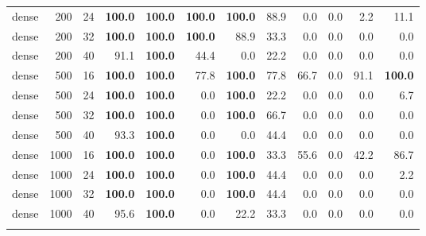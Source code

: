 \begin{table}
\begin{tabular}{lrrrrrrrrrrr}
dense & 200 & 24 & \textbf{100.0} & \textbf{100.0} & \textbf{100.0} & \textbf{100.0} & 88.9 & 0.0 & 0.0 & 2.2 & 11.1 \\
dense & 200 & 32 & \textbf{100.0} & \textbf{100.0} & \textbf{100.0} & 88.9 & 33.3 & 0.0 & 0.0 & 0.0 & 0.0 \\
dense & 200 & 40 & 91.1 & \textbf{100.0} & 44.4 & 0.0 & 22.2 & 0.0 & 0.0 & 0.0 & 0.0 \\
dense & 500 & 16 & \textbf{100.0} & \textbf{100.0} & 77.8 & \textbf{100.0} & 77.8 & 66.7 & 0.0 & 91.1 & \textbf{100.0} \\
dense & 500 & 24 & \textbf{100.0} & \textbf{100.0} & 0.0 & \textbf{100.0} & 22.2 & 0.0 & 0.0 & 0.0 & 6.7 \\
dense & 500 & 32 & \textbf{100.0} & \textbf{100.0} & 0.0 & \textbf{100.0} & 66.7 & 0.0 & 0.0 & 0.0 & 0.0 \\
dense & 500 & 40 & 93.3 & \textbf{100.0} & 0.0 & 0.0 & 44.4 & 0.0 & 0.0 & 0.0 & 0.0 \\
dense & 1000 & 16 & \textbf{100.0} & \textbf{100.0} & 0.0 & \textbf{100.0} & 33.3 & 55.6 & 0.0 & 42.2 & 86.7 \\
dense & 1000 & 24 & \textbf{100.0} & \textbf{100.0} & 0.0 & \textbf{100.0} & 44.4 & 0.0 & 0.0 & 0.0 & 2.2 \\
dense & 1000 & 32 & \textbf{100.0} & \textbf{100.0} & 0.0 & \textbf{100.0} & 44.4 & 0.0 & 0.0 & 0.0 & 0.0 \\
dense & 1000 & 40 & 95.6 & \textbf{100.0} & 0.0 & 22.2 & 33.3 & 0.0 & 0.0 & 0.0 & 0.0 \\
\botrule
\end{tabular}
\end{table}
